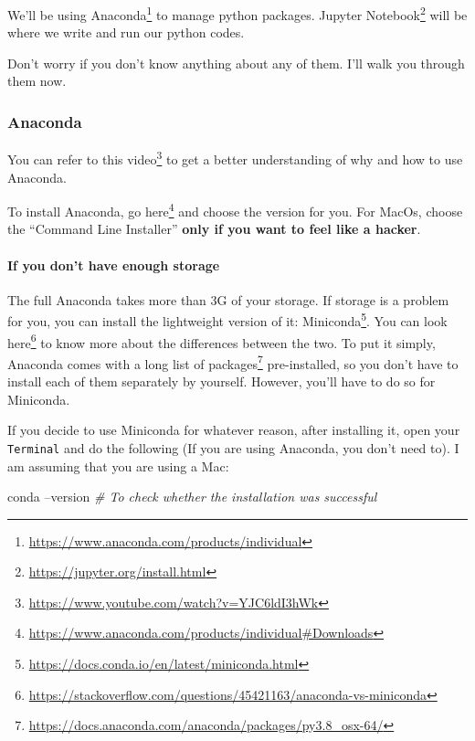 \documentclass[
]{krantz}
\makeatletter
\newenvironment{Shaded}{\begin{snugshade}}{\end{snugshade}}
\newcommand{\CommentTok}[1]{\textcolor[rgb]{0.37,0.37,0.37}{\textit{#1}}}
\newcommand{\ExtensionTok}[1]{#1}
\newcommand{\NormalTok}[1]{#1}
\renewcommand{\href}[2]{#2\footnote{\url{#1}}}
\newenvironment{kframe}{%
\medskip{}
\setlength{\fboxsep}{.8em}
 \def\at@end@of@kframe{}%
 \ifinner\ifhmode%
  \def\at@end@of@kframe{\end{minipage}}%
  \begin{minipage}{\columnwidth}%
 \fi\fi%
 \def\FrameCommand##1{\hskip\@totalleftmargin \hskip-\fboxsep
 \colorbox{shadecolor}{##1}\hskip-\fboxsep
     \hskip-\linewidth \hskip-\@totalleftmargin \hskip\columnwidth}%
 \MakeFramed {\advance\hsize-\width
   \@totalleftmargin\z@ \linewidth\hsize
   \@setminipage}}%
 {\par\unskip\endMakeFramed%
 \at@end@of@kframe}
\renewenvironment{Shaded}{\begin{kframe}}{\end{kframe}}
\makeatother
\begin{document}
We'll be using \href{https://www.anaconda.com/products/individual}{Anaconda} to manage python packages. \href{https://jupyter.org/install.html}{Jupyter Notebook} will be where we write and run our python codes.

Don't worry if you don't know anything about any of them. I'll walk you through them now.

\hypertarget{anaconda}{%
\subsubsection{Anaconda}\label{anaconda}}

You can refer to \href{https://www.youtube.com/watch?v=YJC6ldI3hWk}{this video} to get a better understanding of why and how to use Anaconda.

To install Anaconda, go \href{https://www.anaconda.com/products/individual\#Downloads}{here} and choose the version for you. For MacOs, choose the ``Command Line Installer'' \textbf{only if you want to feel like a hacker}.

\hypertarget{if-you-dont-have-enough-storage}{%
\paragraph{If you don't have enough storage}\label{if-you-dont-have-enough-storage}}

The full Anaconda takes more than 3G of your storage. If storage is a problem for you, you can install the lightweight version of it: \href{https://docs.conda.io/en/latest/miniconda.html}{Miniconda}. You can look \href{https://stackoverflow.com/questions/45421163/anaconda-vs-miniconda}{here} to know more about the differences between the two. To put it simply, Anaconda comes with \href{https://docs.anaconda.com/anaconda/packages/py3.8_osx-64/}{a long list of packages} pre-installed, so you don't have to install each of them separately by yourself. However, you'll have to do so for Miniconda.

If you decide to use Miniconda for whatever reason, after installing it, open your \texttt{Terminal} and do the following (If you are using Anaconda, you don't need to). I am assuming that you are using a Mac:

\begin{Shaded}
\begin{Highlighting}[]
\ExtensionTok{conda}\NormalTok{ --version }\CommentTok{# To check whether the installation was successful}
\end{Highlighting}
\end{Shaded}
\end{document}
